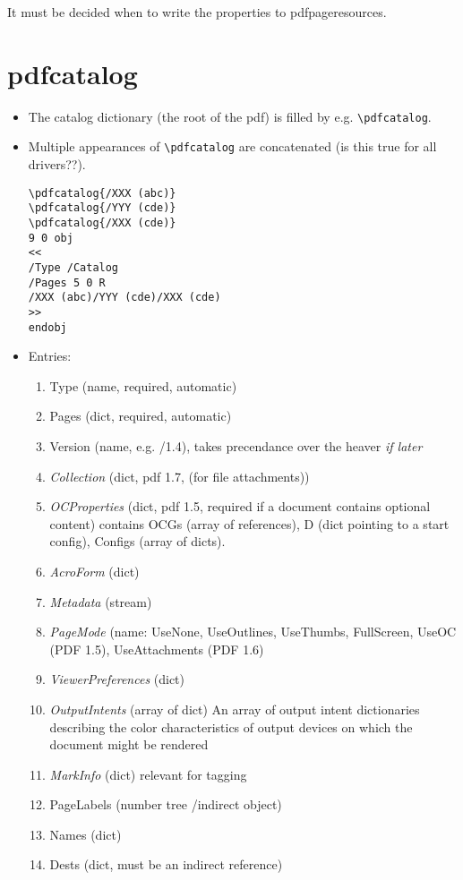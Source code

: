 \documentclass{article}
\begin{document}
It must be decided when to write the properties to pdfpageresources.

\section{pdfcatalog}
\begin{itemize}
\item The catalog dictionary (the root of the pdf) is filled by e.g. \verb+\pdfcatalog+. 
\item Multiple appearances of  \verb+\pdfcatalog+ are concatenated (is this true for all drivers??).

\begin{verbatim}
\pdfcatalog{/XXX (abc)}
\pdfcatalog{/YYY (cde)}
\pdfcatalog{/XXX (cde)}
9 0 obj
<<
/Type /Catalog
/Pages 5 0 R
/XXX (abc)/YYY (cde)/XXX (cde)
>>
endobj
\end{verbatim}

\item Entries:
\begin{enumerate}
  \item Type (name, required, automatic)
  \item Pages (dict, required, automatic)
  \item Version (name, e.g. /1.4), takes precendance over the heaver \emph{if later}
  \item \emph{Collection} (dict, pdf 1.7, (for file attachments)) 
  \item \emph{OCProperties} (dict, pdf 1.5, required if a document contains optional content) 
        contains OCGs (array of references), D (dict pointing to a start config), Configs (array of dicts). 
  \item \emph{AcroForm} (dict)       
  \item \emph{Metadata} (stream)
  \item \emph{PageMode} (name: UseNone, UseOutlines, UseThumbs, FullScreen, UseOC (PDF 1.5),
   UseAttachments (PDF 1.6)
  \item \emph{ViewerPreferences} (dict)
  \item \emph{OutputIntents} (array of dict)
  An array of output intent dictionaries describing the color characteristics of output devices on which the document might be rendered 
  \item \emph{MarkInfo} (dict) relevant for tagging 
  \item PageLabels (number tree /indirect object) 
  \item Names (dict)
  \item Dests (dict, must be an indirect reference) 
   

\end{enumerate}
\end{itemize}
\end{document}
